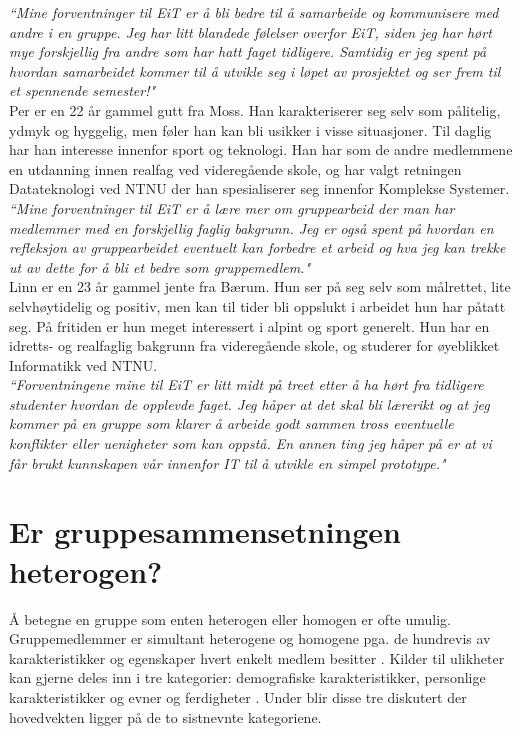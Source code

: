 \textit{``Mine forventninger til EiT er å bli bedre til å samarbeide og kommunisere med andre i en gruppe. Jeg har litt blandede følelser overfor EiT, siden jeg har hørt mye forskjellig fra andre som har hatt faget tidligere. Samtidig er jeg spent på hvordan samarbeidet kommer til å utvikle seg i løpet av prosjektet og ser frem til et spennende semester!"}\\

Per er en 22 år gammel gutt fra Moss. Han karakteriserer seg selv som pålitelig, ydmyk og hyggelig, men føler han kan bli usikker i visse situasjoner. Til daglig har han interesse innenfor sport og teknologi. Han har som de andre medlemmene en utdanning innen realfag ved videregående skole, og har valgt retningen Datateknologi ved NTNU der han spesialiserer seg innenfor Komplekse Systemer.\\

\textit{``Mine forventninger til EiT er å lære mer om gruppearbeid der man har medlemmer med en forskjellig faglig bakgrunn. Jeg er også spent på hvordan en refleksjon av gruppearbeidet eventuelt kan forbedre et arbeid og hva jeg kan trekke ut av dette for å bli et bedre som gruppemedlem."}\\

Linn er en 23 år gammel jente fra Bærum. Hun ser på seg selv som målrettet, lite selvhøytidelig og positiv, men kan til tider bli oppslukt i arbeidet hun har påtatt seg. På fritiden er hun meget interessert i alpint og sport generelt. Hun har en idretts- og realfaglig bakgrunn fra videregående skole, og studerer for øyeblikket Informatikk ved NTNU.\\

\textit{``Forventningene mine til EiT er litt midt på treet etter å ha hørt fra tidligere studenter hvordan de opplevde faget. Jeg håper at det skal bli lærerikt og at jeg kommer på en gruppe som klarer å arbeide godt sammen tross eventuelle konflikter eller uenigheter som kan oppstå. En annen ting jeg håper på er at vi får brukt kunnskapen vår innenfor IT til å utvikle en simpel prototype."}\\

\section{Er gruppesammensetningen heterogen?}
Å betegne en gruppe som enten heterogen eller homogen er ofte umulig. Gruppemedlemmer er simultant heterogene og homogene pga. de hundrevis av karakteristikker og egenskaper hvert enkelt medlem besitter \cite{gruppeteori}. Kilder til ulikheter kan gjerne deles inn i tre kategorier: demografiske karakteristikker, personlige karakteristikker og evner og ferdigheter \cite{gruppeteori}. Under blir disse tre diskutert der hovedvekten ligger på de to sistnevnte kategoriene.\\

